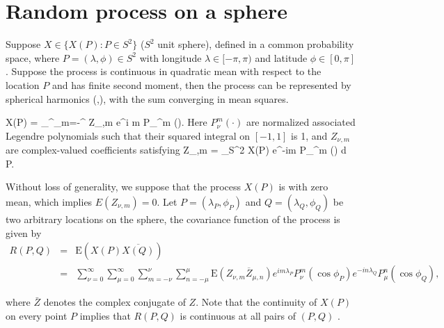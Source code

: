 %
%
%



\section{Random process on a sphere}
	
Suppose $X \in \{X(P): P\in S^2\}$ ($S^2$ unit sphere), defined in a common probability space, where $P=(\lambda, \phi) \in S^2$ with longitude $\lambda \in [-\pi, \pi)$ and latitude $\phi \in [0, \pi]$. Suppose the process is continuous in quadratic mean with respect to the location $P$ and has finite second moment, then the process can be represented by spherical harmonics (\cite{Jones1963},\cite{LiNorth1997, Huang2012}), with the sum converging in mean squares.
			
	\beq \nonumber
	X(P) = \sum_{}^\infty \sum_{m=-\nu}^{\nu} Z_{\nu,m} e^{i m \lambda} P_{\nu}^m (\cos \phi).
	\eeq
Here $P_{\nu}^m(\cdot)$ are normalized associated Legendre polynomials such that their squared integral on $[-1, 1]$
is 1, and $Z_{\nu,m}$ are complex-valued coefficients satisfying	
	\beq \nonumber
	Z_{\nu,m} = \int_{S^2} X(P) e^{-im \lambda} P_{\nu}^m (\cos \phi) d P.
	\eeq
				
	Without loss of generality, we suppose that the process $X(P)$ is with zero mean, which implies $E(Z_{\nu,m}) = 0$. Let $P = (\lambda_P, \phi_P)$ and $Q=(\lambda_Q, \phi_Q)$ be two arbitrary locations on the sphere, the covariance function of the process is given by
	\begin{eqnarray*} \label{rpq_1}
		R(P, Q) &=& \mbox{E}(X(P) \overline{X(Q)}) \\
		&=& \sum_{\nu=0}^\infty \sum_{\mu=0}^\infty \sum_{m=-\nu}^{\nu} \sum_{n=-\mu}^{\mu} \mbox{E}(Z_{\nu,m} \overline{Z}_{\mu,n}) e^{im \lambda_P} P_{\nu}^m(\cos \phi_P) e^{-i n \lambda_Q} P_{\mu}^n (\cos \phi_Q),
	\end{eqnarray*}

where $\bar{Z}$ denotes the complex conjugate of $Z$. Note that the continuity of $X(P)$ on every point $P$ implies that $R(P, Q)$ is continuous at all pairs of $(P, Q)$ \cite[page 83]{Leadbetter1967}. \\
	
	
